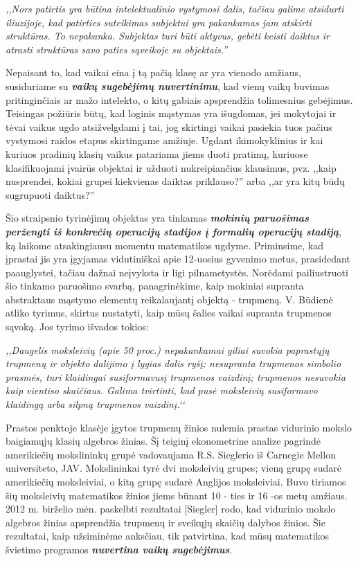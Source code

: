 \documentclass{article}
\begin{document}
\textit{,,Nors patirtis yra būtina intelektualinio vystymosi dalis, tačiau galime atsidurti iliuzijoje, kad patirties suteikimas subjektui yra pakankamas jam atskirti struktūras. To nepakanka. Subjektas turi būti aktyvus, gebėti keisti daiktus ir atrasti struktūras savo paties sąveikoje su objektais.''}

Nepaisant to, kad vaikai eina į tą pačią klasę ar yra vienodo amžiaus, susiduriame su \textbf{\textit{vaikų sugebėjimų nuvertinimu}}, kad vienų vaikų buvimas pritinginčiais ar mažo intelekto, o kitų gabiais apsprendžia tolimesnius gebėjimus. Teisingas požiūris būtų, kad loginis mąstymas yra išugdomas, jei mokytojai ir tėvai vaikus ugdo atsižvelgdami į tai, jog skirtingi vaikai pasiekia tuos pačius vystymosi raidos etapus skirtingame amžiuje. Ugdant ikimokyklinius ir kai kuriuos pradinių klasių vaikus patariama jiems duoti pratimų, kuriuose klasifikuojami įvairūs objektai ir užduoti nukreipiančius klausimus, pvz. ,,kaip nusprendei, kokiai grupei kiekvienas daiktas priklauso?'' arba ,,ar yra kitų būdų sugrupuoti daiktus?''

Šio straipsnio tyrinėjimų objektas yra tinkamas \textbf{\textit{mokinių paruošimas peržengti iš konkrečių operacijų stadijos į formalių operacijų stadiją}}, ką laikome atsakingiausu momentu matematikos ugdyme. Priminsime, kad įprastai jis yra įgyjamas vidutiniškai apie 12-uosius gyvenimo metus, prasidedant paauglystei, tačiau dažnai neįvyksta ir ligi pilnametystės. Norėdami pailiustruoti šio tinkamo paruošimo svarbą, panagrinėkime, kaip mokiniai supranta abstraktaus mąstymo elementų reikalaujantį objektą - trupmeną. V. Būdienė atliko tyrimus, skirtus nustatyti, kaip mūsų šalies vaikai supranta trupmenos sąvoką. Jos tyrimo išvados tokios:

\textit{,,Daugelis moksleivių (apie 50 proc.) nepakankamai giliai suvokia paprastųjų trupmenų ir objekto dalijimo  į  lygias  dalis  ryšį;  nesupranta trupmenos  simbolio  prasmės, turi klaidingai susiformavusį  trupmenos  vaizdinį;   trupmenos nesuvokia   kaip   vientiso skaičiaus. Galima  tvirtinti, kad  pusė  moksleivių  susiformavo  klaidingą arba  silpną trupmenos vaizdinį.‘‘}

Prastos penktoje klasėje įgytos trupmenų žinios nulemia prastas vidurinio mokslo baigiamųjų klasių algebros žinias. Šį teiginį ekonometrine  analize pagrindė amerikiečių mokslininkų grupė vadovaujama R.S. Sieglerio  iš Carnegie  Mellon universiteto,  JAV. Mokslininkai  tyrė  dvi moksleivių  grupes;  vieną grupę sudarė amerikiečių  moksleiviai, o kitą grupę sudarė Anglijos moksleiviai. Buvo tiriamos šių moksleivių matematikos žinios jiems būnant 10 - ties ir 16 -os metų amžiaus. 2012 m. birželio mėn. paskelbti rezultatai [Siegler] rodo, kad vidurinio mokslo algebros žinias apsprendžia trupmenų ir sveikųjų skaičių dalybos žinios. Šie rezultatai, kaip užsiminėme anksčiau, tik patvirtina, kad mūsų matematikos švietimo programos \textbf{\textit{nuvertina vaikų sugebėjimus}}.
\end{document}
